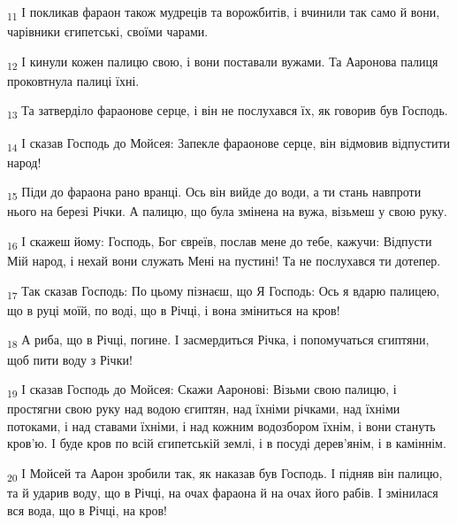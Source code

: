 \begin{tcolorbox}
\textsubscript{11} І покликав фараон також мудреців та ворожбитів, і вчинили так само й вони, чарівники єгипетські, своїми чарами.
\end{tcolorbox}
\begin{tcolorbox}
\textsubscript{12} І кинули кожен палицю свою, і вони поставали вужами. Та Ааронова палиця проковтнула палиці їхні.
\end{tcolorbox}
\begin{tcolorbox}
\textsubscript{13} Та затверділо фараонове серце, і він не послухався їх, як говорив був Господь.
\end{tcolorbox}
\begin{tcolorbox}
\textsubscript{14} І сказав Господь до Мойсея: Запекле фараонове серце, він відмовив відпустити народ!
\end{tcolorbox}
\begin{tcolorbox}
\textsubscript{15} Піди до фараона рано вранці. Ось він вийде до води, а ти стань навпроти нього на березі Річки. А палицю, що була змінена на вужа, візьмеш у свою руку.
\end{tcolorbox}
\begin{tcolorbox}
\textsubscript{16} І скажеш йому: Господь, Бог євреїв, послав мене до тебе, кажучи: Відпусти Мій народ, і нехай вони служать Мені на пустині! Та не послухався ти дотепер.
\end{tcolorbox}
\begin{tcolorbox}
\textsubscript{17} Так сказав Господь: По цьому пізнаєш, що Я Господь: Ось я вдарю палицею, що в руці моїй, по воді, що в Річці, і вона зміниться на кров!
\end{tcolorbox}
\begin{tcolorbox}
\textsubscript{18} А риба, що в Річці, погине. І засмердиться Річка, і попомучаться єгиптяни, щоб пити воду з Річки!
\end{tcolorbox}
\begin{tcolorbox}
\textsubscript{19} І сказав Господь до Мойсея: Скажи Ааронові: Візьми свою палицю, і простягни свою руку над водою єгиптян, над їхніми річками, над їхніми потоками, і над ставами їхніми, і над кожним водозбором їхнім, і вони стануть кров'ю. І буде кров по всій єгипетській землі, і в посуді дерев'янім, і в каміннім.
\end{tcolorbox}
\begin{tcolorbox}
\textsubscript{20} І Мойсей та Аарон зробили так, як наказав був Господь. І підняв він палицю, та й ударив воду, що в Річці, на очах фараона й на очах його рабів. І змінилася вся вода, що в Річці, на кров!
\end{tcolorbox}
